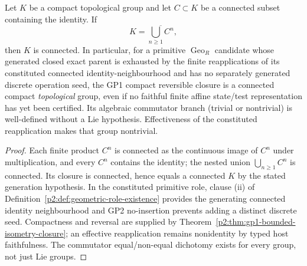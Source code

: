 \documentclass[12pt,a4paper]{article}
\begin{document}
\begin{lemma}
\label{p2a:lem:v281-connected-generated-group}
Let \(K\) be a compact topological group and let \(C\subset K\) be a
connected subset containing the identity.  If
\[
 K=\overline{\bigcup_{n\geq1}C^n},
\]
then \(K\) is connected.  In particular, for a primitive
\(\operatorname{Geo}_R\) candidate whose generated closed exact parent
is exhausted by the finite reapplications of its constituted connected
identity-neighbourhood and has no separately generated discrete
operation seed, the GP1 compact reversible closure is a connected
compact \emph{topological} group, even if no faithful finite affine
state/test representation has yet been certified.  Its algebraic
commutator branch (trivial or nontrivial) is well-defined without a
Lie hypothesis.  Effectiveness of the constituted reapplication
makes that group nontrivial.
\end{lemma}
\begin{proof}
Each finite product \(C^n\) is connected as the continuous image of
\(C^n\) under multiplication, and every \(C^n\) contains the
identity; the nested union \(\bigcup_{n\geq1}C^n\) is connected.
Its closure is connected, hence equals a connected \(K\) by the
stated generation hypothesis.  In the constituted primitive role,
clause (ii) of Definition~\ref{p2:def:geometric-role-existence}
provides the generating connected identity neighbourhood and GP2
no-insertion prevents adding a distinct discrete seed.  Compactness
and reversal are supplied by
Theorem~\ref{p2:thm:gp1-bounded-isometry-closure}; an effective
reapplication remains nonidentity by typed host faithfulness.  The
commutator equal/non-equal dichotomy exists for every group, not just
Lie groups.
\end{proof}
\end{document}
